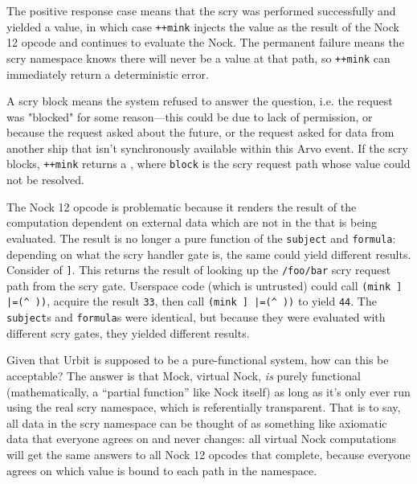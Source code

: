 \documentclass[twoside]{article}
\begin{document}
\noindent
The positive response case means that the scry was performed successfully and yielded a value, in which case \texttt{++mink} injects the value as the result of the Nock 12 opcode and continues to evaluate the Nock.  The permanent failure means the scry namespace knows there will never be a value at that path, so \texttt{++mink} can immediately return a deterministic error.

A scry block means the system refused to answer the question, i.e. the request was "blocked" for some reason—this could be due to lack of permission, or because the request asked about the future, or the request asked for data from another ship that isn't synchronously available within this Arvo event. If the scry blocks, \texttt{++mink} returns a \texttt{}, where \texttt{block} is the scry request path whose value could not be resolved.

The Nock 12 opcode is problematic because it renders the result of the computation dependent on external data which are not in the \texttt{} that is being evaluated.  The result is no longer a pure function of the \texttt{subject} and \texttt{formula}:  depending on what the scry handler gate is, the same \texttt{} could yield different results.  Consider \texttt{} of \texttt{\string[0 \string[12 1 /foo/bar\string]\string]}.  This returns the result of looking up the \texttt{/foo/bar} scry request path from the scry gate. Userspace code (which is untrusted) could call \texttt{(mink \string[\string[0 12 1 /foo/bar\string]\string] |=(\string^ \string[\textasciitilde \textasciitilde 33\string]))}, acquire the result \texttt{33}, then call \texttt{(mink \string[\string[0 12 1 /foo/bar\string]\string] |=(\string^ \string[\textasciitilde \textasciitilde 44\string]))} to yield \texttt{44}.  The \texttt{subject}s and \texttt{formula}s were identical, but because they were evaluated with different scry gates, they yielded different results.

Given that Urbit is supposed to be a pure-functional system, how can this be acceptable?  The answer is that Mock, virtual Nock, \emph{is} purely functional (mathematically, a ``partial function'' like Nock itself) as long as it's only ever run using the real scry namespace, which is referentially transparent.  That is to say, all data in the scry namespace can be thought of as something like axiomatic data that everyone agrees on and never changes:  all virtual Nock computations will get the same answers to all Nock 12 opcodes that complete, because everyone agrees on which value is bound to each path in the namespace.
\end{document}
